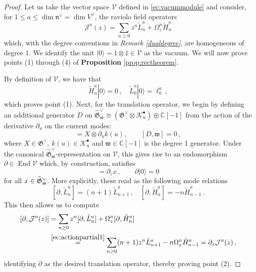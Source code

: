 \documentclass[10pt,a4paper]{amsart}
\newcommand{\C}{{\mathbb C}}
\newcommand{\fG}{\mathfrak{G}}
\newcommand{\tH}{{\tilde H}}
\newcommand{\tL}{{\tilde L}}
\begin{document}
\begin{proof}
Let us take the vector space $\mathcal{V}$ defined in \eqref{ec:vacummodule} and consider, for $1\leq a\leq \operatorname{dim}\mathfrak{n}^\vee=\operatorname{dim}V^\vee$, the raviolo field operators
\begin{equation}
    \mathcal{J}^a(z) = \sum_{n\geq 0} z^n \tL_n^a  + \Omega_z^n \tH^a_n
\end{equation}
which, with the degree conventions in \textit{Remark \ref{dualdegree}}, are homogeneous of degree $1$. We identify the unit $ |0\rangle=1\otimes 1\in\mathcal{V}$ as the vacuum. We will now prove points (1) through (4) of \textbf{Proposition} \ref{prop:rectheorem}. 



By definition of $\mathcal{V}$, we have that
\begin{equation}
    \tH_n^a |0\rangle=0 \,,\quad  \tL_0^a|0\rangle = \ell_0^a\,,\label{vacmodulepolynomials}
\end{equation}
which proves point (1). Next, for the translation operator, we 
begin by defining an additional generator $D$ on $\widehat{\fG}^\vee_\mathfrak{w}\cong (\fG^\vee\otimes\mathcal{K}^\bullet_u)\oplus \C[-1]$ from the action of the derivative $\partial_u$ on the current modes:
\begin{equation*}
    [D,X\otimes k(u)] = X\otimes\partial_u k(u), \qquad [D,\mathfrak{w}]=0\,,
\end{equation*}
where $X\in\fG^\vee,~ k(u)\in\mathcal{K}_u^\bullet$ and $\mathfrak{w}\in\C[-1]$ is the degree 1 generator.  Under the canonical $\widehat{\fG}^\vee_\mathfrak{w}$-representation  on $\mathcal{V}$, this gives rise to an endomorphism $\partial\in\operatorname{End}\mathcal{V}$ which, by construction, satisfies
\begin{equation}
    [\partial,x]=\partial_z x\,,\qquad \partial|0\rangle = 0\label{translate}
\end{equation}
for all $x\in \widehat{\fG}^\vee_\frak{w}$. More explicitly,  these read as the following mode relations
\begin{equation}
\label{ec:actionpartial1}
    [\partial ,\tL_n^a] = (n+1)\tL_{n+1}^a\,,\quad [\partial, \tH_n^a] = -n \tH_{n-1}^a\,.
\end{equation}
This then allows us to compute
\begin{equation}
\label{ec:actionpartial2}
\begin{split}
    [\partial,\mathcal{J}^a(z)]
    &=\sum_{n\geq 0}z^n[\partial,\tL_n^a]+ \Omega_z^n[\partial,\tH_n^a] \\
&\stackrel{\eqref{ec:actionpartial1}}{=} \sum_{n\geq 0 }(n+1)z^n \tL_{n+1}^a - n\Omega^{n}_z\tH_{n-1}^a=\partial_z \mathcal{J}^a(z)\,,
\end{split} 
\end{equation}
identifying $\partial$ as the desired translation operator, thereby proving point (2). 


\end{proof}
\end{document}
